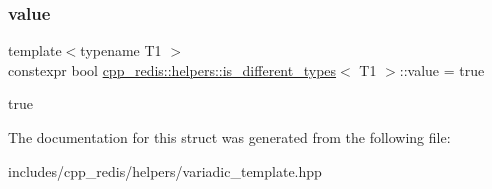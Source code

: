 \subsubsection{\texorpdfstring{value}{value}}
{\footnotesize\ttfamily template$<$typename T1 $>$ \\
constexpr bool \hyperlink{structcpp__redis_1_1helpers_1_1is__different__types}{cpp\+\_\+redis\+::helpers\+::is\+\_\+different\+\_\+types}$<$ T1 $>$\+::value = true\hspace{0.3cm}{\ttfamily [static]}}

true 

The documentation for this struct was generated from the following file\+:\begin{DoxyCompactItemize}
\item 
includes/cpp\+\_\+redis/helpers/variadic\+\_\+template.\+hpp\end{DoxyCompactItemize}
